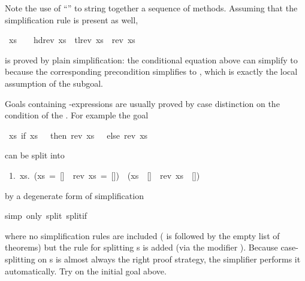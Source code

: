 \begin{isabellebody}
%
\begin{isamarkuptext}%
\noindent
Note the use of ``'' to string together a
sequence of methods. Assuming that the simplification rule
is present as well,%
\end{isamarkuptext}%
\ {\isachardoublequote}xs\ {\isasymnoteq}\ {\isacharbrackleft}{\isacharbrackright}\ {\isasymLongrightarrow}\ hd{\isacharparenleft}rev\ xs{\isacharparenright}\ {\isacharhash}\ tl{\isacharparenleft}rev\ xs{\isacharparenright}\ {\isacharequal}\ rev\ xs{\isachardoublequote}%
\begin{isamarkuptext}%
\noindent
is proved by plain simplification:
the conditional equation  above
can simplify  to 
because the corresponding precondition 
simplifies to , which is exactly the local
assumption of the subgoal.%
\end{isamarkuptext}%
%
%
\begin{isamarkuptext}%
Goals containing -expressions are usually proved by case
distinction on the condition of the . For example the goal%
\end{isamarkuptext}%
\ {\isachardoublequote}{\isasymforall}xs{\isachardot}\ if\ xs\ {\isacharequal}\ {\isacharbrackleft}{\isacharbrackright}\ then\ rev\ xs\ {\isacharequal}\ {\isacharbrackleft}{\isacharbrackright}\ else\ rev\ xs\ {\isasymnoteq}\ {\isacharbrackleft}{\isacharbrackright}{\isachardoublequote}%
\begin{isamarkuptxt}%
\noindent
can be split into
\begin{isabelle}
~1.~{\isasymforall}xs.~(xs~=~[]~{\isasymlongrightarrow}~rev~xs~=~[])~{\isasymand}~(xs~{\isasymnoteq}~[]~{\isasymlongrightarrow}~rev~xs~{\isasymnoteq}~[])
\end{isabelle}
by a degenerate form of simplification%
\end{isamarkuptxt}%
simp\ only{\isacharcolon}\ split{\isacharcolon}\ split{\isacharunderscore}if{\isacharparenright}%
\begin{isamarkuptext}%
\noindent
where no simplification rules are included ( is followed by the
empty list of theorems) but the rule  for
splitting s is added (via the modifier ). Because
case-splitting on s is almost always the right proof strategy, the
simplifier performs it automatically. Try 
on the initial goal above.


\end{isamarkuptext}
\end{isabellebody}

